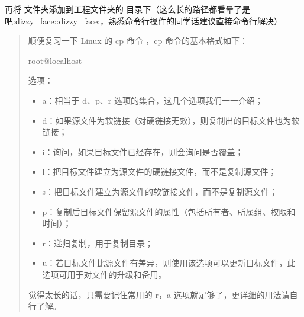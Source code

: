 \documentclass[a4paper,12pt,english]{sphinxmanual}
\begin{document}
\sphinxAtStartPar
再将  文件夹添加到工程文件夹的  目录下（这么长的路径都看晕了是吧:dizzy\_face::dizzy\_face:，熟悉命令行操作的同学话建议直接命令行解决）
\begin{quote}

\sphinxAtStartPar
顺便复习一下 Linux 的 cp 命令 ，cp 命令的基本格式如下：

\begin{sphinxVerbatim}[commandchars=\\\{\}]
\PYG{o}{[}root@localhost \PYGZti{}\PYG{o}{]}
\end{sphinxVerbatim}

\sphinxAtStartPar
选项：
\begin{itemize}
\item {} 
\sphinxAtStartPar
\sphinxhyphen{}a：相当于 \sphinxhyphen{}d、\sphinxhyphen{}p、\sphinxhyphen{}r 选项的集合，这几个选项我们一一介绍；

\item {} 
\sphinxAtStartPar
\sphinxhyphen{}d：如果源文件为软链接（对硬链接无效），则复制出的目标文件也为软链接；

\item {} 
\sphinxAtStartPar
\sphinxhyphen{}i：询问，如果目标文件已经存在，则会询问是否覆盖；

\item {} 
\sphinxAtStartPar
\sphinxhyphen{}l：把目标文件建立为源文件的硬链接文件，而不是复制源文件；

\item {} 
\sphinxAtStartPar
\sphinxhyphen{}s：把目标文件建立为源文件的软链接文件，而不是复制源文件；

\item {} 
\sphinxAtStartPar
\sphinxhyphen{}p：复制后目标文件保留源文件的属性（包括所有者、所属组、权限和时间）；

\item {} 
\sphinxAtStartPar
\sphinxhyphen{}r：递归复制，用于复制目录；

\item {} 
\sphinxAtStartPar
\sphinxhyphen{}u：若目标文件比源文件有差异，则使用该选项可以更新目标文件，此选项可用于对文件的升级和备用。

\end{itemize}

\sphinxAtStartPar
觉得太长的话，只需要记住常用的 \sphinxhyphen{}r，\sphinxhyphen{}a 选项就足够了，更详细的用法请自行了解。
\end{quote}
\end{document}
